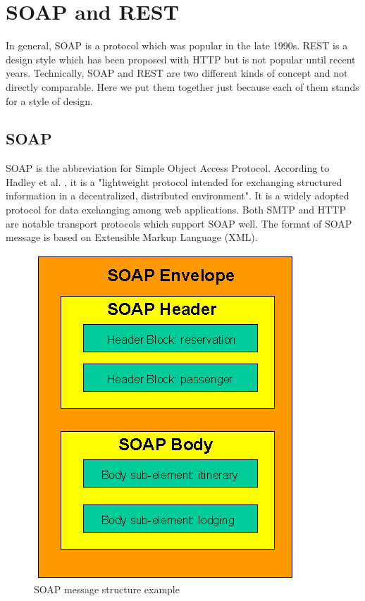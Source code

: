 \documentclass{Nan_Thesis}
\begin{document}
\section{SOAP and REST} 
In general, SOAP is a protocol which was popular in the late 1990s. REST is a design style which has been proposed with HTTP but is not popular until recent years. Technically, SOAP and REST are two different kinds of concept and not directly comparable. Here we put them together just because each of them stands for a style of design.
\subsection{SOAP} 
SOAP is the abbreviation for Simple Object Access Protocol. According to Hadley et al. \cite{hadley2003soap}, it is a "lightweight protocol intended for exchanging structured information in a decentralized, distributed environment". It is a widely adopted protocol for data exchanging among web applications. Both SMTP and HTTP are notable transport protocols which support SOAP well. The format of SOAP message is based on Extensible Markup Language (XML).

\begin{figure}[h]
  \centering 
      \includegraphics[scale=0.8]{pic/soapformat.png} 
  \caption{SOAP message structure example \cite{mitra2003soap}}
\end{figure}
\end{document}
